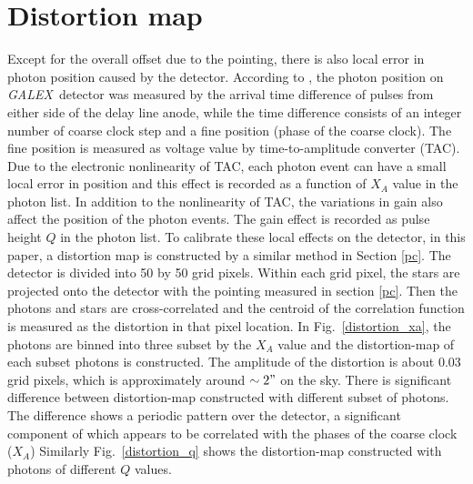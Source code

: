 \documentclass[12pt, preprint]{aastex61}
\newcommand{\project}[1]{\textsl{#1}}
\newcommand{\galex}{\project{GALEX}}
\begin{document}
\section{Distortion map}
\label{dm}
Except for the overall offset due to the pointing, there is also local error in photon position caused by the detector. 
According to \cite{galex_cal}, the photon position on \galex\ detector was measured by the arrival time difference of pulses from either side of the delay line anode, while the time difference consists of an integer number of coarse clock step and a fine position (phase of the coarse clock).
The fine position is measured as voltage value by time-to-amplitude converter (TAC).
Due to the electronic nonlinearity of TAC, each photon event can have a small local error in position and this effect is recorded as a function of $X_A$ value in the photon list.
In addition to the nonlinearity of TAC, the variations in gain also affect the position of the photon events.
The gain effect is recorded as pulse height $Q$ in the photon list.
To calibrate these local effects on the detector, in this paper, a distortion map is constructed by a similar method in Section \ref{pc}.  
The detector is divided into 50 by 50 grid pixels. 
Within each grid pixel, the stars are projected onto the detector with the pointing measured in section \ref{pc}.
Then the photons and stars are cross-correlated and the centroid of the correlation function is measured as the distortion in that pixel location.
In Fig.~\ref{distortion_xa}, the photons are binned into three subset by the $X_A$ value and the distortion-map of each subset photons is constructed.
The amplitude of the distortion is about 0.03 grid pixels, which is approximately around $\sim 2"$ on the sky.
There is significant difference between distortion-map constructed with different subset of photons.
The difference shows a periodic pattern over the detector, a significant component of which appears to be correlated with the phases of the coarse clock ($X_A$)
Similarly Fig.~\ref{distortion_q} shows the distortion-map constructed with photons of different $Q$ values.
\end{document}
